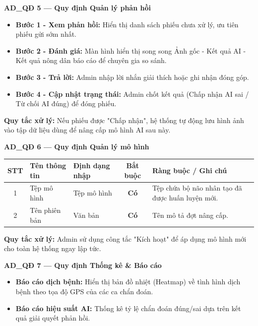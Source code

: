 \documentclass[12pt,a4paper]{article}
\begin{document}
\vspace{0.4cm}
\noindent\textbf{AD\_QĐ 5 --- Quy định Quản lý phản hồi}
\begin{itemize}
    \item \textbf{Bước 1 - Xem phản hồi:} Hiển thị danh sách phiếu chưa xử lý, ưu tiên phiếu gửi sớm nhất.
    \item \textbf{Bước 2 - Đánh giá:} Màn hình hiển thị song song Ảnh gốc - Kết quả AI - Kết quả nông dân báo cáo để chuyên gia so sánh.
    \item \textbf{Bước 3 - Trả lời:} Admin nhập lời nhắn giải thích hoặc ghi nhận đóng góp.
    \item \textbf{Bước 4 - Cập nhật trạng thái:} Admin chốt kết quả (Chấp nhận AI sai / Từ chối AI đúng) để đóng phiếu.
\end{itemize}
\noindent\textbf{Quy tắc xử lý:} Nếu phiếu được "Chấp nhận", hệ thống tự động lưu hình ảnh vào tập dữ liệu dùng để nâng cấp mô hình AI sau này.

\vspace{0.4cm}
\noindent\textbf{AD\_QĐ 6 --- Quy định Quản lý mô hình}
\begin{longtable}{|c|l|p{2.5cm}|c|p{5cm}|}
\hline
\rowcolor{headerblue}
\textbf{STT} & \textbf{Tên thông tin} & \textbf{Định dạng nhập} & \textbf{Bắt buộc} & \textbf{Ràng buộc / Ghi chú} \\
\hline
\endhead
1 & Tệp mô hình & Tệp mô hình & \textbf{Có} & Tệp chứa bộ não nhân tạo đã được huấn luyện mới. \\
\hline
2 & Tên phiên bản & Văn bản & \textbf{Có} & Tên mô tả đợt nâng cấp. \\
\hline
\end{longtable}
\noindent\textbf{Quy tắc xử lý:} Admin sử dụng công tắc "Kích hoạt" để áp dụng mô hình mới cho toàn hệ thống ngay lập tức.

\vspace{0.4cm}
\noindent\textbf{AD\_QĐ 7 --- Quy định Thống kê \& Báo cáo}
\begin{itemize}
    \item \textbf{Báo cáo dịch bệnh:} Hiển thị bản đồ nhiệt (Heatmap) về tình hình dịch bệnh theo tọa độ GPS của các ca chẩn đoán.
    \item \textbf{Báo cáo hiệu suất AI:} Thống kê tỷ lệ chẩn đoán đúng/sai dựa trên kết quả giải quyết phản hồi.
\end{itemize}

\end{document}
